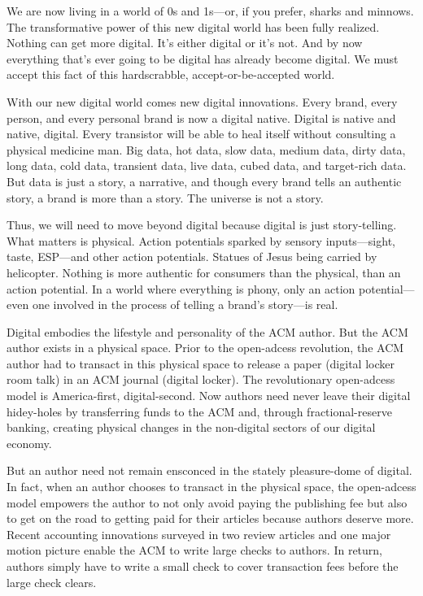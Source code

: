 We are now living in a world of 0s and 1s---or, if you prefer, sharks and minnows. The transformative power of this new digital world has been fully realized. Nothing can get more digital. It's either digital or it's not. And by now everything that's ever going to be digital has already become digital. We must accept this fact of this hardscrabble, accept-or-be-accepted world.

With our new digital world comes new digital innovations. Every brand, every person, and every personal brand is now a digital native. Digital is native and native, digital. Every transistor will be able to heal itself without consulting a physical medicine man. Big data, hot data, slow data, medium data, dirty data, long data, cold data, transient data, live data, cubed data, and target-rich data. But data is just a story, a narrative, and though every brand tells an authentic story, a brand is more than a story. The universe is not a story.

Thus, we will need to move beyond digital because digital is just story-telling. What matters is physical. Action potentials sparked by sensory inputs---sight, taste, ESP---and other action potentials. Statues of Jesus being carried by helicopter. Nothing is more authentic for consumers than the physical, than an action potential. In a world where everything is phony, only an action potential---even one involved in the process of telling a brand's story---is real.

Digital embodies the lifestyle and personality of the ACM author. But the ACM author exists in a physical space. Prior to the open-adcess revolution, the ACM author had to transact in this physical space to release a paper (digital locker room talk) in an ACM journal (digital locker). The revolutionary open-adcess model is America-first, digital-second. Now authors need never leave their digital hidey-holes by transferring funds to the ACM and, through fractional-reserve banking, creating physical changes in the non-digital sectors of our digital economy. 

But an author need not remain ensconced in the stately pleasure-dome of digital. In fact, when an author chooses to transact in the physical space, the open-adcess model empowers the author to not only avoid paying the publishing fee but also to get on the road to getting paid for their articles because authors deserve more.
\fi
Recent accounting innovations surveyed in two review articles and one major
motion picture \cite{ftc, check-scams, mich} enable the ACM to write large
checks to authors. In return, authors simply have to write a small check to
cover transaction fees before the large check clears.

